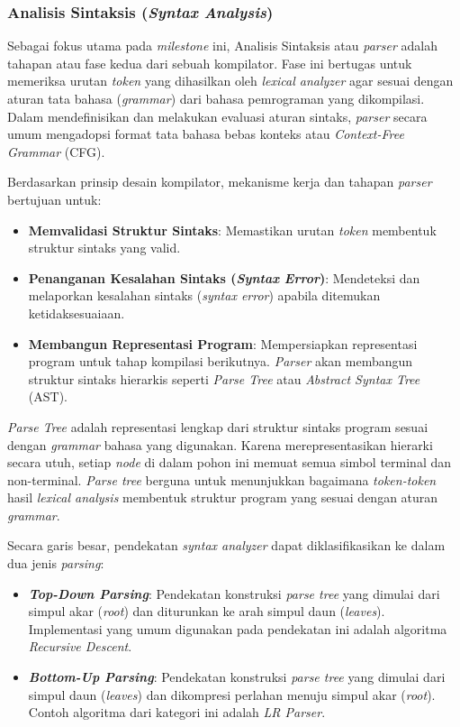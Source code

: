 \documentclass[12pt,a4paper]{article}
\begin{document}
\subsubsection{Analisis Sintaksis (\textit{Syntax Analysis})}
Sebagai fokus utama pada \textit{milestone} ini, Analisis Sintaksis atau
\textit{parser} adalah tahapan atau fase kedua dari sebuah kompilator. Fase ini
bertugas untuk memeriksa urutan \textit{token} yang dihasilkan oleh
\textit{lexical analyzer} agar sesuai dengan aturan tata bahasa
(\textit{grammar}) dari bahasa pemrograman yang dikompilasi.  Dalam
mendefinisikan dan melakukan evaluasi aturan sintaks, \textit{parser} secara
umum mengadopsi format tata bahasa bebas konteks atau \textit{Context-Free
Grammar} (CFG).

Berdasarkan prinsip desain kompilator, mekanisme kerja dan tahapan \textit{parser} bertujuan untuk:
\begin{itemize}
    \item \textbf{Memvalidasi Struktur Sintaks}: Memastikan urutan
        \textit{token} membentuk struktur sintaks yang valid.
    \item \textbf{Penanganan Kesalahan Sintaks (\textit{Syntax Error})}:
        Mendeteksi dan melaporkan kesalahan sintaks (\textit{syntax error})
        apabila ditemukan ketidaksesuaiaan.
    \item \textbf{Membangun Representasi Program}: Mempersiapkan representasi
        program untuk tahap kompilasi berikutnya. \textit{Parser} akan membangun
        struktur sintaks hierarkis seperti \textit{Parse Tree} atau
        \textit{Abstract Syntax Tree} (AST).
\end{itemize}


\textit{Parse Tree} adalah representasi lengkap dari struktur sintaks program sesuai dengan \textit{grammar} bahasa yang digunakan. Karena merepresentasikan hierarki secara utuh, setiap \textit{node} di dalam pohon ini memuat semua simbol terminal dan non-terminal. \textit{Parse tree} berguna untuk menunjukkan bagaimana \textit{token-token} hasil \textit{lexical analysis} membentuk struktur program yang sesuai dengan aturan \textit{grammar}.

Secara garis besar, pendekatan \textit{syntax analyzer} dapat diklasifikasikan ke dalam dua jenis \textit{parsing}:
\begin{itemize}
    \item \textbf{\textit{Top-Down Parsing}}: Pendekatan konstruksi \textit{parse tree} yang dimulai dari simpul akar (\textit{root}) dan diturunkan ke arah simpul daun (\textit{leaves}). Implementasi yang umum digunakan pada pendekatan ini adalah algoritma \textit{Recursive Descent}.
    \item \textbf{\textit{Bottom-Up Parsing}}: Pendekatan konstruksi \textit{parse tree} yang dimulai dari simpul daun (\textit{leaves}) dan dikompresi perlahan menuju simpul akar (\textit{root}). Contoh algoritma dari kategori ini adalah \textit{LR Parser}.
\end{itemize}
\end{document}
